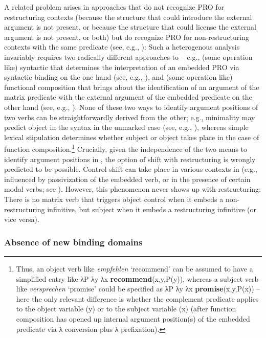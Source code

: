 \documentclass[output=paper]{langsci/langscibook}
\begin{document}
A related problem arises in approaches that do not recognize PRO for
restructuring contexts (because the structure that could introduce the external
argument is not present, or because the structure that could license the
external argument is not present, or both) but do recognize PRO for
non-restructuring contexts with the same predicate (see, e.g.,
\citealt{Haider:10}): Such a heterogenous analysis invariably requires two
radically different approaches to  -- e.g., (some operation like)
syntactic  that determines the interpretation of an embedded PRO via
syntactic binding on the one hand (see, e.g., \citealt{Landau:00}), and (some
operation like) functional composition that brings about the identification of
an argument of the matrix predicate with the external argument of the embedded
predicate on the other hand (see, e.g., \citealt{Stiebels:07:tow}). None of these
two ways to identify argument positions of two verbs can be straightforwardly
derived from the other; e.g., minimality may predict object  in the
syntax in the unmarked case (see, e.g., \citealt{Hornstein2001}), whereas simple
lexical stipulation determines whether subject or object  takes place in
the case of function composition.\footnote{Thus, an object  verb  like
    {\itshape empfehlen} \enquote*{recommend} can  be assumed to have a simplified
    entry like λP λy λx {\bfseries recommend}(x,y,P(y)), whereas a subject 
    verb like {\itshape versprechen} \enquote*{promise} could be specified as λP λy
    λx {\bfseries promise}(x,y,P(x)) -- here the only relevant difference is whether
    the complement predicate applies to the object variable (y) or to the
    subject variable (x) (after function composition has opened up internal
argument position(s) of the embedded predicate via λ conversion plus λ
prefixation).} Crucially, given the independence of the two means to identify
argument positions in , the option of  shift with restructuring
is wrongly predicted to be possible. Control shift can take place in various
contexts in   (e.g., influenced by passivization of the embedded verb, or
in the presence of certain modal verbs; see
\citealt{Ruzicka:83,Wurmbrand:02,Stiebels:07:tow}). However, this phenomenon never
shows up with restructuring: There is no matrix verb that triggers object
control when it embeds a non-restructuring infinitive, but subject  when
it embeds a restructuring infinitive (or vice versa).


\subsubsection{\label{b3}Absence of new binding domains}
\end{document}
